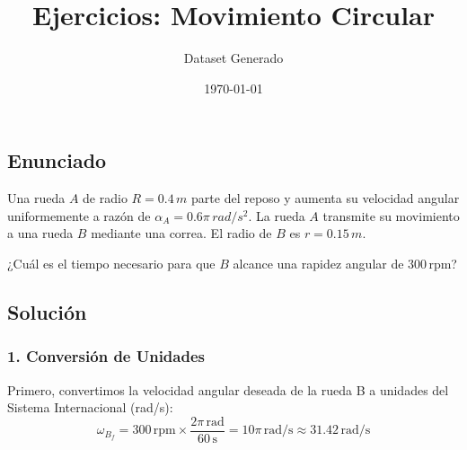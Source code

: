 \documentclass[12pt, a4paper]{article}
\title{Ejercicios: Movimiento Circular}
\author{Dataset Generado}
\date{\today}
\begin{document}
\maketitle
\subsection*{Enunciado}
Una rueda $A$ de radio $R = 0.4 \, \si{m}$ parte del reposo y aumenta su velocidad angular uniformemente a razón de $\alpha_A = 0.6\pi \, \si{rad/s^2}$. La rueda $A$ transmite su movimiento a una rueda $B$ mediante una correa. El radio de $B$ es $r = 0.15 \, \si{m}$.

¿Cuál es el tiempo necesario para que $B$ alcance una rapidez angular de $300 \, \text{rpm}$?

\begin{center}
\end{center}

\subsection*{Solución}

\subsubsection*{1. Conversión de Unidades}
Primero, convertimos la velocidad angular deseada de la rueda B a unidades del Sistema Internacional (rad/s):
$$ \omega_{B_f} = 300 \, \text{rpm} \times \frac{2\pi \, \text{rad}}{60 \, \text{s}} = 10\pi \, \text{rad/s} \approx 31.42 \, \text{rad/s} $$
\end{document}
